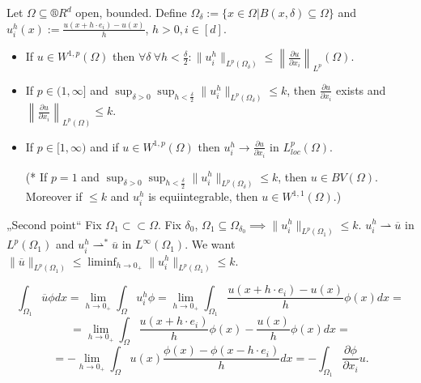 \documentclass[12pt]{article}					%
\begin{document}
\begin{veta}
	Let $\Omega \subseteq ®R^d$ open, bounded. Define $\Omega_\delta := \{x \in \Omega | B(x, \delta) \subseteq \Omega\}$ and $u_i^h(x) := \frac{u(x + h·e_i) - u(x)}{h}$, $h > 0, i \in [d]$.

	\begin{itemize}
		\item If $u \in W^{1, p}(\Omega)$ then $\forall \delta\ \forall h < \frac{\delta}{2}: \|u_i^h\|_{L^p(\Omega_\delta)} ≤ \left\|\frac{\partial u}{\partial x_i}\right\|_{L^p}(\Omega)$.
		\item If $p \in (1, ∞]$ and $\sup_{\delta > 0} \sup_{h < \frac{\delta}{2}} \|u_i^h\|_{L^p(\Omega_\delta)} ≤ k$, then $\frac{\partial u}{\partial x_i}$ exists and $\left\|\frac{\partial u}{\partial x_i}\right\|_{L^p(\Omega)} ≤ k$.
		\item If $p \in [1, ∞)$ and if $u \in W^{1, p}(\Omega)$ then $u_i^h \rightarrow \frac{\partial u}{\partial x_i}$ in $L_{loc}^p(\Omega)$.
		\item[(*] If $p = 1$ and $\sup_{\delta > 0} \sup_{h < \frac{\delta}{2}} \|u_i^h\|_{L^p(\Omega_\delta)} ≤ k$, then $u \in BV(\Omega)$. Moreover if $≤k$ and $u_i^h$ is equiintegrable, then $u \in W^{1, 1}(\Omega)$.)
	\end{itemize}

	\begin{dukazin}
		„Second point“ Fix $\Omega_1 \subset\subset \Omega$. Fix $\delta_0$, $\Omega_1 \subseteq \Omega_{\delta_0} \implies \|u_i^h\|_{L^p(\Omega_1)} ≤ k$. $u_i^h \rightharpoonup \overline u$ in $L^p(\Omega_1)$ and $u_i^h \rightharpoonup^* \overline u$ in $L^∞(\Omega_1)$.
		We want $\|\overline{u}\|_{L^p(\Omega_1)} ≤ \liminf_{h \rightarrow 0_+} \|u_i^h\|_{L^p(\Omega_1)} ≤ k$.

		$$ \int_{\Omega_1} \overline{u} \phi dx = \lim_{h \rightarrow 0_+} \int_\Omega u_i^h \phi = \lim_{h \rightarrow 0_+} \int_{\Omega_1} \frac{u(x + h·e_i) - u(x)}{h} \phi(x) dx = $$
		$$ = \lim_{h \rightarrow 0_+} \int_{\Omega} \frac{u(x + h·e_i)}{h} \phi(x) - \frac{u(x)}{h}\phi(x) dx = $$
		$$ = -\lim_{h \rightarrow 0_+} \int_{\Omega} u(x) \frac{\phi(x) - \phi(x - h·e_i)}{h} dx = -\int_{\Omega_1} \frac{\partial \phi}{\partial x_i} u. $$
	\end{dukazin}
\end{veta}
\end{document}

